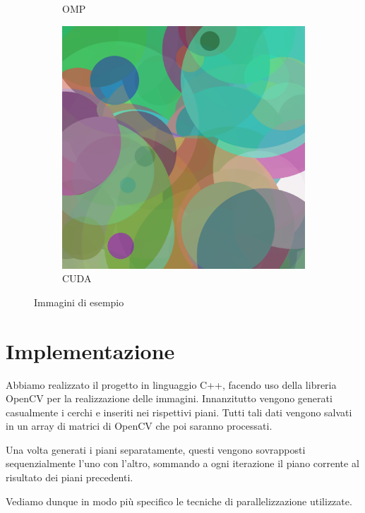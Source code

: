 \documentclass[11pt]{article}
\begin{document}
\begin{figure}[h!]
\begin{subfigure}{0.32\textwidth}
            \caption{OMP}
        \end{subfigure}%
        \hfill
        \begin{subfigure}{0.32\textwidth}
            \centering
            \includegraphics[width=\textwidth]{../results/img/cuda/3000}
            \caption{CUDA}
        \end{subfigure}
        \caption{Immagini di esempio}
        \label{fig:example-images}
    \end{figure}

    \section{Implementazione}\label{sec:implementazione}
    Abbiamo realizzato il progetto in linguaggio C++, facendo uso della libreria OpenCV per la realizzazione delle immagini.
    Innanzitutto vengono generati casualmente i cerchi e inseriti nei rispettivi piani.
    Tutti tali dati vengono salvati in un array di matrici di OpenCV che poi saranno processati.
    
    Una volta generati i piani separatamente, questi vengono sovrapposti sequenzialmente l'uno con l'altro,
    sommando a ogni iterazione il piano corrente al risultato dei piani precedenti.
    
    Vediamo dunque in modo più specifico le tecniche di parallelizzazione utilizzate.
\end{document}
